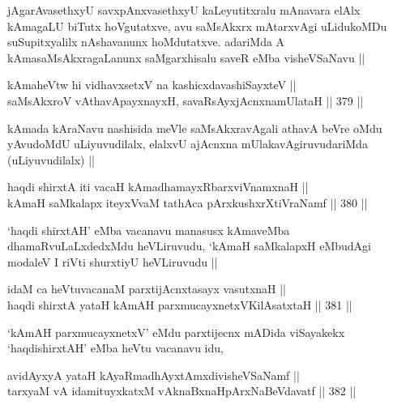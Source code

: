 \begin{artha}
jAgarAvasethxyU savxpAnxvasethxyU kaLeyutitxralu mAnavara elAlx
kAmagaLU biTutx hoVgutatxve, avu saMsAkxrx mAtarxvAgi uLidukoMDu
suSupitxyalilx nAshavanunx hoMdutatxve. adariMda A
kAmasaMsAkxragaLanunx saMgarxhisalu saveR eMba visheVSaNavu ||
\end{artha}


\begin{shl}
kAmaheVtw hi vidhavxsetxV na kashicxdavashiSayxteV || \\
saMsAkxroV vA\s thavA\s payxnayxH, savaRsAyxjAcnxnamUlataH ||  379 ||  
\end{shl}

\begin{artha}
kAmada kAraNavu nashisida meVle saMsAkxravAgali athavA beVre oMdu
yAvudoMdU uLiyuvudilalx, elalxvU ajAcnxna mUlakavAgiruvudariMda
(uLiyuvudilalx) ||
\end{artha}


\begin{shl}
haqdi shirxtA iti vacaH kAmadhamayxRbarxviVnamxnaH || \\
kAmaH saMkalapx iteyxVvaM tathAca pArxkushxrXtiVraNamf ||  380 ||  
\end{shl}

\begin{artha}
`haqdi shirxtAH' eMba vacanavu manasusx kAmaveMba dhamaRvuLaLxdedxMdu
  heVLiruvudu, `kAmaH saMkalapxH eMbudAgi modaleV I riVti shurxtiyU
  heVLiruvudu ||
\end{artha}

\begin{shl}
idaM ca heVtuvacanaM parxtijAcnxtasayx vasutxnaH || \\
haqdi shirxtA yataH kAmAH parxmucayxnetxV\s KilAsatxtaH ||  381 ||  
\end{shl}

\begin{artha}
`kAmAH parxmucayxnetxV' eMdu parxtijecnx mADida viSayakekx
  `haqdishirxtAH' eMba heVtu vacanavu idu, 
\end{artha}

\begin{shl}
avidAyxyA yataH kAyaRmadhAyxtAmxdivisheVSaNamf || \\
tarxyaM vA idamituyxkatxM vAknaBxnaHpArxNaBeVdavatf ||  382 ||  
\end{shl}
				

